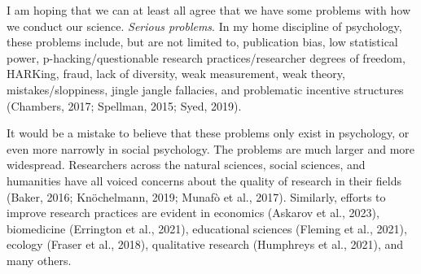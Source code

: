 \documentclass[authordate, empirical,issue]{jote-new-article}
\author[1]{\mbox{Moin Syed\orcid{0000-0003-4759-3555}}}
\affil[1]{Department of Psychology, University of Minnesota}
\begin{document}
\begin{frontmatter}
  \maketitle
  \begin{abstract}
    \printabstracttext
  \end{abstract}
\end{frontmatter}
































I am hoping that we can at least all agree that we have some problems with how we conduct our science. \emph{Serious problems}. In my home discipline of psychology, these problems include, but are not limited to, publication bias, low statistical power, p-hacking/questionable research practices/researcher degrees of freedom, HARKing, fraud, lack of diversity, weak measurement, weak theory, mistakes/sloppiness, jingle jangle fallacies, and problematic incentive structures (Chambers, 2017; Spellman, 2015; Syed, 2019).







It would be a mistake to believe that these problems only exist in psychology, or even more narrowly in social psychology. The problems are much larger and more widespread. Researchers across the natural sciences, social sciences, and humanities have all voiced concerns about the quality of research in their fields (Baker, 2016; Knöchelmann, 2019; Munafò et al., 2017). Similarly, efforts to improve research practices are evident in economics (Askarov et al., 2023), biomedicine (Errington et al., 2021), educational sciences (Fleming et al., 2021), ecology (Fraser et al., 2018), qualitative research (Humphreys et al., 2021), and many others.
\end{document}
